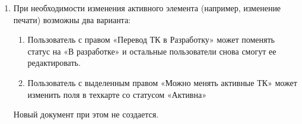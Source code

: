 \begin{enumerate}

\item	При необходимости изменения активного элемента   (например, изменение печати) возможны два варианта:

\begin{enumerate}
\item	Пользователь с правом «Перевод ТК в Разработку» может поменять статус  на «В разработке» и остальные пользователи снова смогут ее редактировать.
\item	Пользователь с выделенным правом «Можно менять активные ТК» может изменить поля в техкарте со статусом «Активна»
\end{enumerate}
Новый документ  при этом не создается.
\end{enumerate}





